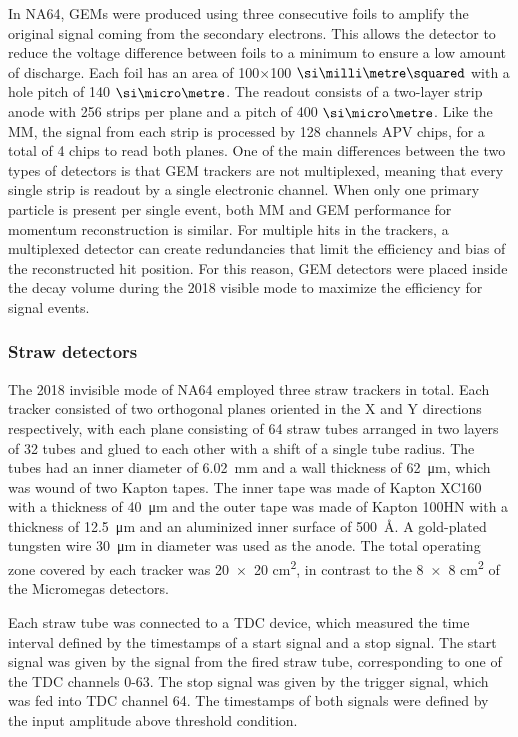 In NA64, GEMs were produced using three consecutive foils to amplify the original signal coming from the secondary electrons. This allows the detector to reduce the voltage difference between foils to a minimum to ensure a low amount of discharge. Each foil has an area of 100$\times$100 $\mms$ with a hole pitch of 140 $\mum$. The readout consists of a two-layer strip anode with 256 strips per plane and a pitch of 400 $\mum$. Like the MM, the signal from each strip is processed by 128 channels APV chips, for a total of 4 chips to read both planes.
One of the main differences between the two types of detectors is that GEM trackers are not multiplexed, meaning that every single strip is readout by a single electronic channel. When only one primary particle is present per single event, both MM and GEM performance for momentum reconstruction is similar. For multiple hits in the trackers, a multiplexed detector can create redundancies that limit the efficiency and bias of the reconstructed hit position. For this reason, GEM detectors were placed inside the decay volume during the 2018 visible mode to maximize the efficiency for signal events.

\subsubsection{Straw detectors}

The 2018 invisible mode of NA64 employed three straw trackers in total. Each tracker consisted of two orthogonal planes oriented in the X and Y directions respectively, with each plane consisting of 64 straw tubes arranged in two layers of 32 tubes and glued to each other with a shift of a single tube radius. The tubes had an inner diameter of \SI{6.02}{\milli\metre} and a wall thickness of \SI{62}{\micro\metre}, which was wound of two Kapton tapes. The inner tape was made of Kapton XC160 with a thickness of \SI{40}{\micro\metre} and the outer tape was made of Kapton 100HN with a thickness of \SI{12.5}{\micro\metre} and an aluminized inner surface of \SI{500}{\angstrom}. A gold-plated tungsten wire 30~μm in diameter was used as the anode. The total operating zone covered by each tracker was \num{20 x 20} \si{\square\centi\metre}, in contrast to the \num{8 x 8} \si{\square\centi\metre} of the Micromegas detectors.

Each straw tube was connected to a TDC device, which measured the time interval defined by the timestamps of a start signal and a stop signal. The start signal was given by the signal from the fired straw tube, corresponding to one of the TDC channels 0-63. The stop signal was given by the trigger signal, which was fed into TDC channel 64. The timestamps of both signals were defined by the input amplitude above threshold condition.

